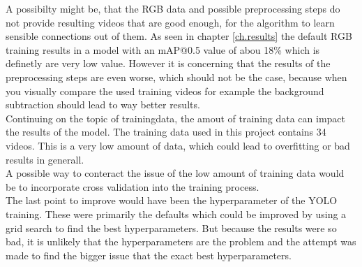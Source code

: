 A possibilty might be, that the RGB data and possible preprocessing steps do not provide resulting videos that are good enough, for the algorithm to learn sensible connections out of them. As seen in chapter \ref{ch.results} the default RGB training results in a model with an mAP@0.5 value of abou 18\% which is definetly are very low value. However it is concerning that the results of the preprocessing steps are even worse, which should not be the case, because when you visually compare the used training videos for example the background subtraction should lead to way better results. \\
Continuing on the topic of trainingdata, the amout of training data can impact the results of the model. The training data used in this project contains 34 videos. This is a very low amount of data, which could lead to overfitting or bad results in generall. \\
A possible way to conteract the issue of the low amount of training data would be to incorporate cross validation into the training process.\\
The last point to improve would have been the hyperparameter of the YOLO training. These were primarily the defaults which could be improved by using a grid search to find the best hyperparameters. But because the results were so bad, it is unlikely that the hyperparameters are the problem and the attempt was made to find the bigger issue that the exact best hyperparameters.


